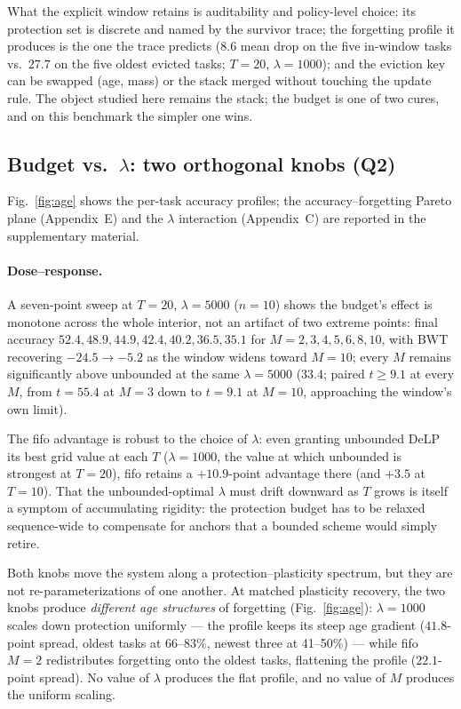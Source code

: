 \documentclass[review,11pt,number]{elsarticle}
\newcommand{\delp}{DeLP}
\begin{document}
What the explicit window retains is auditability and
policy-level choice: its protection set is discrete and named by the
survivor trace; the forgetting profile it produces is the one the
trace predicts ($8.6$ mean drop on the five in-window tasks vs.\ $27.7$
on the five oldest evicted tasks; $T{=}20$, $\lambda{=}1000$); and the
eviction key can be swapped (age, mass) or the stack merged without
touching the update rule. The object studied here remains the stack;
the budget is one of two cures, and on this benchmark the simpler one
wins.

\subsection{Budget vs.\ $\lambda$: two orthogonal knobs (Q2)}
\label{sec:exp-knobs}

Fig.~\ref{fig:age} shows the per-task accuracy profiles; the
accuracy--forgetting Pareto plane (Appendix~E) and the $\lambda$
interaction (Appendix~C) are reported in the supplementary material.

\paragraph{Dose--response.}
A seven-point sweep at $T{=}20$, $\lambda{=}5000$ ($n{=}10$) shows the
budget's effect is monotone across the whole interior, not an artifact
of two extreme points: final accuracy $52.4, 48.9, 44.9, 42.4, 40.2,
36.5, 35.1$ for $M{=}2,3,4,5,6,8,10$, with BWT recovering
$-24.5 \to -5.2$ as the window widens toward $M{=}10$; every $M$
remains significantly above unbounded at the same
$\lambda{=}5000$ ($33.4$; paired $t\geq 9.1$ at every $M$,
from $t{=}55.4$ at $M{=}3$ down to $t{=}9.1$ at $M{=}10$, approaching
the window's own limit).





The fifo advantage is robust to the choice of $\lambda$: even granting
unbounded \delp{} its best grid value at each $T$ ($\lambda{=}1000$, the
value at which unbounded is strongest at $T{=}20$), fifo retains a
$+10.9$-point advantage there (and $+3.5$ at $T{=}10$). That the
unbounded-optimal $\lambda$ must drift downward as $T$ grows is itself
a symptom of accumulating rigidity: the protection budget has to be
relaxed sequence-wide to compensate for anchors that a bounded scheme
would simply retire.

Both knobs move the system along a protection--plasticity spectrum,
but they are not re-parameterizations of one another. At matched
plasticity recovery, the two knobs produce \emph{different age
structures} of forgetting (Fig.~\ref{fig:age}):
$\lambda{=}1000$ scales down protection uniformly --- the profile
keeps its steep age gradient ($41.8$-point spread, oldest tasks at
66--83\%, newest three at 41--50\%) --- while fifo $M{=}2$
redistributes forgetting onto the oldest tasks, flattening the
profile ($22.1$-point spread).
No value of $\lambda$ produces the flat profile, and no value of $M$
produces the uniform scaling.
\end{document}
